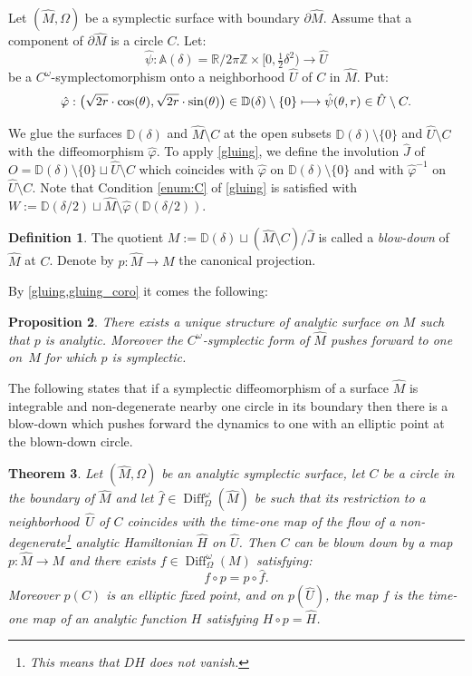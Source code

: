 \documentclass[JEP,XML,SOM,Unicode,NoFloatCountersInSection,Unicode,published]{cedram}
\newcommand\mto{\mathchoice{\longmapsto}{\mapsto}{\mapsto}{\mapsto}}
\newcommand\A{\mathbb A}
\newcommand\R{\mathbb R}
\newcommand\D{\mathbb D}
\newcommand\Z{\mathbb Z}
\DeclareMathOperator\Diff{Diff}
\newtheorem{proposition}{Proposition}[section]
\newtheorem{theorem}[proposition]{Theorem}
\theoremstyle{definition}
\newtheorem{definition}[proposition] {Definition}
\begin{document}
Let $(\hat M,\Omega)$ be a symplectic surface with boundary $\partial \hat M$. Assume that a component of $\partial \hat M$ is a circle $C$. Let:
\[\hat \psi: \A(\delta)=\R/2\pi \Z \times [0, \tfrac12 \delta^2)\to \hat U\]
be a $C^\omega$-symplectomorphism onto a neighborhood $\hat U$ of $C$ in $\hat M$. Put:
\begin{equation} \label{eq hat phi} \hat \varphi:\bigl(\sqrt{2r } \cdot \cos (\theta), \sqrt{2r }\cdot \sin (\theta)\bigr)\in \D(\delta)\setminus \{0\} \mto \hat \psi(\theta,r)\in \hat U\setminus C.\end{equation}

We glue the surfaces
$ \D(\delta)$ and
$ \hat M\setminus C$ at the open subsets $ \D(\delta)\setminus \{0\}$ and $ \hat U\setminus C$ with the diffeomorphism $\hat \varphi$. To apply \cref{gluing}, we define the involution $\hat J$ of $O=\D(\delta)\setminus \{0\}\sqcup
\hat U\setminus C$ which coincides with $\hat \varphi$ on $\D(\delta)\setminus \{0\}$ and with $\hat \varphi^{-1}$ on $\hat U\setminus C$. Note that Condition \eqref{enum:C} of \cref{gluing} is satisfied with $W:= \D(\delta /2) \sqcup \hat M \setminus \hat \varphi (\D(\delta /2))$.
\begin{definition} The quotient $ M:= \D(\delta)\sqcup (\hat M\setminus C)/\hat J$ is called a \emph{blow-down} of~$\hat M$ at $C$. Denote by $p: \hat M\to M$ the canonical projection. \end{definition}
By \cref{gluing,gluing_coro} it comes the following:
\begin{proposition}\label{prop blow-down} There exists a unique structure of analytic surface on $M$ such that $p$ is analytic. Moreover the $C^\omega$-symplectic form of $\hat M$ pushes forward to one on~$M$ for which $p$ is symplectic.
\end{proposition}
The following states that if a symplectic diffeomorphism of a surface $\hat M$ is integrable and non-degenerate nearby one circle in its boundary then there is a blow-down which pushes forward the dynamics to one with an elliptic point at the blown-down circle.
\begin{theorem}\label{thm blow-down}
Let $(\hat M,\Omega)$ be an analytic symplectic surface, let $C$ be a circle in the boundary of $\hat M$ and let $\hat f\in \Diff^\omega_\Omega(\hat M)$ be such that its restriction to a neighborhood~$\hat U$ of $C$ coincides with the time-one map of the flow of a non-degenerate\footnote{This means that $DH$ does not vanish.} analytic Hamiltonian $\widehat H$ on $\hat U$. Then $C$ can be blown down by a map $p: \hat M\to M$ and there exists $ f\in
\Diff^\omega_\Omega(M)$ satisfying:
\[f\circ p = p \circ \hat f.\]
Moreover $p(C)$ is an elliptic fixed point, and
on $p(\hat U)$, the map $f$ is the time-one map of an analytic function $H$ satisfying $H\circ p= \widehat H$.
\end{theorem}
\end{document}
